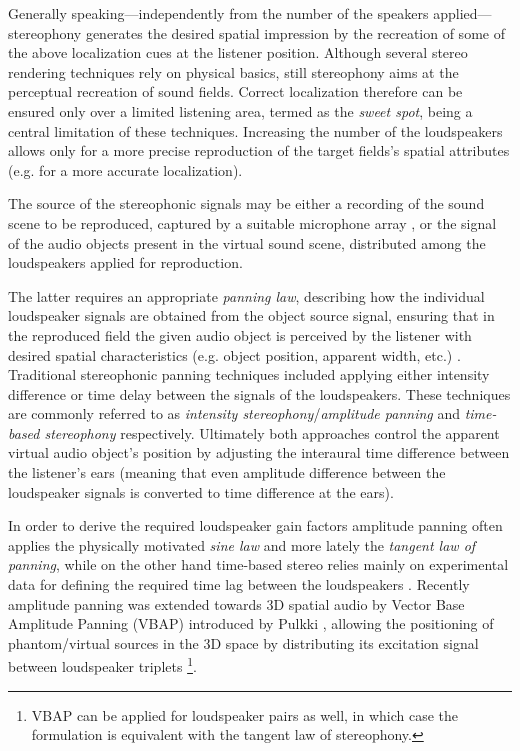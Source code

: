 Generally speaking---independently from the number of the speakers applied---stereophony generates the desired spatial impression by the recreation of some of the above localization cues at the listener position.
Although several stereo rendering techniques rely on physical basics, still stereophony aims at the perceptual recreation of sound fields.
Correct localization therefore can be ensured only over a limited listening area, termed as the \emph{sweet spot}, being a central limitation of these techniques.
Increasing the number of the loudspeakers allows only for a more precise reproduction of the target fields's spatial attributes (e.g. for a more accurate localization).

The source of the stereophonic signals may be either a recording of the sound scene to be reproduced, captured by a suitable microphone array \cite{lipshitz1985stereo, williams1999microphone, wittek2017development}, or the signal of the audio objects present in the virtual sound scene, distributed among the loudspeakers applied for reproduction.

The latter requires an appropriate \emph{panning law}, describing how the individual loudspeaker signals are obtained from the object source signal, ensuring that in the reproduced field the given audio object is perceived by the listener with desired spatial characteristics (e.g. object position, apparent width, etc.) \cite{Pulkki2001a, Pulkki2001b}.
Traditional stereophonic panning techniques included applying either intensity difference or time delay between the signals of the loudspeakers.
These techniques are commonly referred to as \emph{intensity stereophony}/\emph{amplitude panning} and \emph{time-based stereophony} respectively.
Ultimately both approaches control the apparent virtual audio object's position by adjusting the interaural time difference between the listener's ears (meaning that even amplitude difference between the loudspeaker signals is converted to time difference at the ears).

In order to derive the required loudspeaker gain factors amplitude panning often applies the physically motivated \emph{sine law} \cite{Bauer1961, Rabenstein2007} and more lately the \emph{tangent law of panning}\cite{Bennett1985, Rabenstein2007}, while on the other hand time-based stereo relies mainly on experimental data for defining the required time lag between the loudspeakers \cite{lipshitz1985stereo, Hugonnet1997, Rumsey2001}.
Recently amplitude panning was extended towards 3D spatial audio by Vector Base Amplitude Panning (VBAP) introduced by Pulkki \cite{Pulkki1997}, allowing the positioning of phantom/virtual sources in the 3D space by distributing its excitation signal between loudspeaker triplets \footnote{VBAP can be applied for loudspeaker pairs as well, in which case the formulation is equivalent with the tangent law of stereophony.}.

